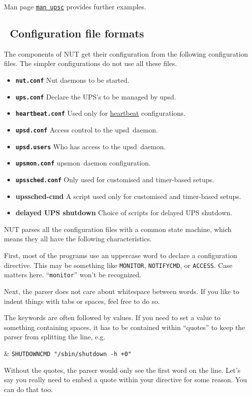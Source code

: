 \documentclass[12pt]{article}
\newlength{\headersep}\setlength{\headersep}{3mm}
\newcommand{\Hsep}{\hspace{\headersep}}
\newcommand{\upsd}{\mbox{\textcolor{UPSDCOLOUR}{upsd}}}
\newcommand{\upsmon}{\mbox{\textcolor{MONCOLOUR}{upsmon}}}
\newcommand{\upsschedcmd}{\mbox{\textcolor{CMDCOLOUR}{upssched-cmd}}}
\newcommand{\nutconf}{\textcolor{NUTCOLOUR}{\texttt{nut.conf}}}
\newcommand{\upsconf}{\textcolor{UPSDCOLOUR}{\texttt{ups.conf}}}
\newcommand{\heartbeatconf}{\textcolor{UPSDCOLOUR}{\texttt{heartbeat.conf}}}
\newcommand{\upsdconf}{\textcolor{UPSDCOLOUR}{\texttt{upsd.conf}}}
\newcommand{\upsdusers}{\textcolor{UPSDCOLOUR}{\texttt{upsd.users}}}
\newcommand{\upsmonconf}{\textcolor{MONCOLOUR}{\texttt{upsmon.conf}}}
\newcommand{\upsschedconf}{\textcolor{SCHEDCOLOUR}{\texttt{upssched.conf}}}
\newcommand{\NUTman}[1]{\href{https://networkupstools.org/docs/man/#1.html}{\texttt{man #1}}}
\newcommand{\ul}{\begin{itemize}%
   \setlength{\itemsep}{0em}}
\newcommand{\eul}{\end{itemize}}
\newcommand{\li}{\item}                 %
\begin{document}
\noindent Man page \NUTman{upsc} provides further examples.


\subsection{\Hsep\ Configuration file formats}\label{section:conffileformat}

The components of NUT get their configuration from the following configuration files.
The simpler configurations do not use all these files.

\ul
\li \textbf{\nutconf}       \quad Nut daemons to be started.
\li \textbf{\upsconf}       \quad Declare the UPS's to be managed by \upsd.
\li \textbf{\heartbeatconf} \quad Used only for \hyperref[heartbeat]{heartbeat} configurations.
\li \textbf{\upsdconf}      \quad Access control to the \upsd\ daemon.
\li \textbf{\upsdusers}     \quad Who has access to the \upsd\ daemon.
\li \textbf{\upsmonconf}    \quad \upsmon\ daemon configuration.
\li \textbf{\upsschedconf}  \quad Only used for customised and timer-based setups.
\li \textbf{\upsschedcmd}   \quad A script used only for customised and timer-based setups.
\li \textbf{delayed UPS shutdown} \quad Choice of scripts for delayed UPS shutdown.
\eul

NUT parses all the configuration files with a common state machine, which
means they all have the following characteristics.

First, most of the programs use an uppercase word to declare a configuration
directive.  This may be something like \texttt{MONITOR}, \texttt{NOTIFYCMD},
or \texttt{ACCESS}.  Case matters here.  ``\texttt{monitor}'' won't be
recognized.

Next, the parser does not care about whitespace between words.  If you
like to indent things with tabs or spaces, feel free to do so.

The keywords are often followed by values. If you need to set a value to
something containing spaces, it has to be contained within ``quotes'' to keep
the parser from splitting the line, e.g.

\begin{LinePrinter}[0.9\LinePrinterwidth]
\Clunk & \verb`SHUTDOWNCMD "/sbin/shutdown -h +0"` \\
\end{LinePrinter}

Without the quotes, the parser would only see the first word on the line.
Let's say you really need to embed a quote within your directive for some
reason.  You can do that too.
\end{document}
